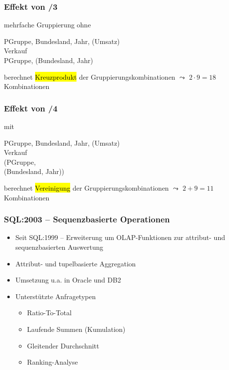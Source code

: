     
    
    
    
    \begin{frame}
    
      \frametitle{Effekt von  /3}
    
      mehrfache Gruppierung ohne 
    
      \begin{sql}
         PGruppe, Bundesland, Jahr, (Umsatz) \\
         Verkauf \\
         PGruppe, (Bundesland, Jahr)
      \end{sql}
    
      berechnet \hl{Kreuzprodukt} der Gruppierungskombinationen $\leadsto$ $2 \cdot 9 = 18$ Kombinationen
    
    \end{frame}
    
    
    \begin{frame}
    
      \frametitle{Effekt von  /4}
    
    mit 
    
    \begin{sql}
       PGruppe, Bundesland, Jahr, (Umsatz) \\
       Verkauf \\
      (PGruppe, \\
      \1 (Bundesland, Jahr))
    \end{sql}
    
     berechnet \hl{Vereinigung} der Gruppierungskombinationen $\leadsto$ $2 + 9 = 11$ Kombinationen
    \end{frame}
    
    \begin{frame}
    
    \frametitle{SQL:2003 -- Sequenzbasierte Operationen}
    
    \begin{itemize}
    \item Seit SQL:1999 -- Erweiterung um OLAP-Funktionen zur attribut- und
      sequenzbasierten Auswertung
    \item Attribut- und tupelbasierte Aggregation
    \item Umsetzung u.a. in Oracle und DB2
    \item Unterstützte Anfragetypen
      \begin{itemize}
      \item Ratio-To-Total
      \item Laufende Summen (Kumulation)
      \item Gleitender Durchschnitt
      \item Ranking-Analyse
      \end{itemize}
    \end{itemize}
    
    \end{frame}
    
